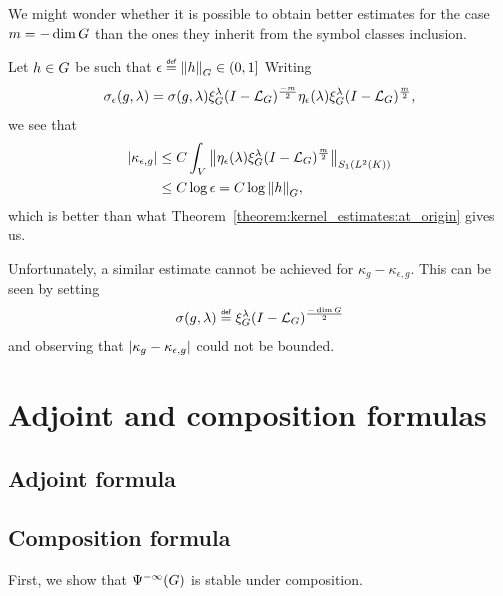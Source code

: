\begin{remark}[Kernel estimates when $m = -\dim \Group$]
    We might wonder whether it is possible to obtain better estimates for the case $m = -\dim \Group$
    than the ones they inherit from the symbol classes inclusion.

    Let $h \in \Group$ be such that $\epsilon \defeq \norm [\Group] h \in (0, 1]$
    Writing
    \begin{align*}
        \sigma_\epsilon(g, \lambda)
        = \sigma(g, \lambda) \Rep \lambda \BesselPotential {-m} \eta_\epsilon(\lambda) \Rep \lambda \BesselPotential {m},
    \end{align*}
    we see that
    \begin{align*}
        \abs {\kappa_{\epsilon, g}}
        &\leq C \int_\VectorSpace \norm [\SchattenClasses 1 {\Lebesgue 2 \CompactGroup}] {\eta_\epsilon(\lambda) \Rep \lambda \BesselPotential m}\\
        &\leq C \log \epsilon = C \log \norm [\Group] h,
    \end{align*}
    which is better than what Theorem~\ref{theorem:kernel_estimates:at_origin} gives us.

    Unfortunately,
    a similar estimate cannot be achieved for $\kappa_g - \kappa_{\epsilon, g}$.
    This can be seen by setting
    \begin{align*}
        \sigma(g, \lambda) \defeq \Rep \lambda \BesselPotential {-\dim \Group}
    \end{align*}
    and observing that
    $\abs {\kappa_g - \kappa_{\epsilon, g}}$ could not be bounded.
\end{remark}

\section{Adjoint and composition formulas}

\subsection{Adjoint formula}

\subsection{Composition formula}

First, we show that $\SmoothingOperators$ is stable under composition.

